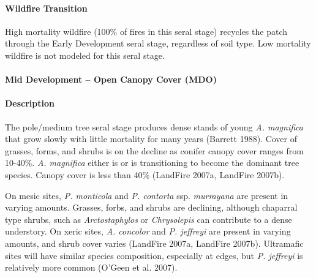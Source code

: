 \paragraph{Wildfire Transition} High mortality wildfire (100\% of fires in this seral stage) recycles the patch through the Early Development seral stage, regardless of soil type. Low mortality wildfire is not modeled for this seral stage.

\noindent\hrulefill


\paragraph{Mid Development – Open Canopy Cover (MDO)} 

\paragraph{Description} The pole/medium tree seral stage produces dense stands of young \emph{A. magnifica} that grow slowly with little mortality for many years (Barrett 1988). Cover of grasses, forms, and shrubs is on the decline as conifer canopy cover ranges from 10-40\%. \emph{A. magnifica} either is or is transitioning to become the dominant tree species. Canopy cover is less than 40\% (LandFire 2007a, LandFire 2007b).

On mesic sites, \emph{P. monticola} and \emph{P. contorta} ssp. \emph{murrayana} are present in varying amounts. Grasses, forbs, and shrubs are declining, although chaparral type shrubs, such as \emph{Arctostaphylos} or \emph{Chrysolepis} can contribute to a dense understory. On xeric sites, \emph{A. concolor} and \emph{P. jeffreyi} are present in varying amounts, and shrub cover varies (LandFire 2007a, LandFire 2007b). Ultramafic sites will have similar species composition, especially at edges, but \emph{P. jeffreyi} is relatively more common (O'Geen et al. 2007).


